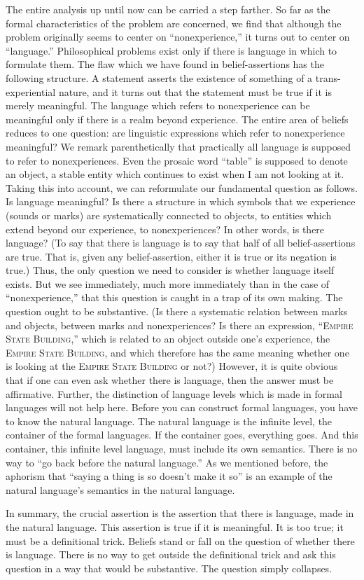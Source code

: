 The entire analysis up until now can be carried a step farther. So far as the formal characteristics of the problem are concerned, we find that although the problem originally seems to center on \enquote{nonexperience,} it turns out to center on \enquote{language.} Philosophical problems exist only if there is language in which to formulate them. The flaw which we have found in belief-assertions has the following structure. A statement asserts the existence of something of a trans-experiential nature, and it turns out that the statement must be true if it is merely meaningful. The language which refers to nonexperience can be meaningful only if there is a realm beyond experience. The entire area of beliefs reduces to one question: are linguistic expressions which refer to nonexperience meaningful? We remark parenthetically that practically all language is supposed to refer to nonexperiences. Even the prosaic word \enquote{table} is supposed to denote an object, a stable entity which continues to exist when I am not looking at it. Taking this into account, we can reformulate our fundamental question as follows. Is language meaningful? Is there a structure in which symbols that we experience (sounds or marks) are systematically connected to objects, to entities which extend beyond our experience, to nonexperiences? In other words, is there language? (To say that there is language is to say that half of all belief-assertions are true. That is, given any belief-assertion, either it is true or its negation is true.) Thus, the only question we need to consider is whether language itself exists. But we see immediately, much more immediately than in the case of \enquote{nonexperience,} that this question is caught in a trap of its own making. The question ought to be substantive. (Is there a systematic relation between marks and objects, between marks and nonexperiences? Is there an expression, \enquote{\textsc{Empire State Building,}} which is related to an object outside one's experience, the \textsc{Empire State Building}, and which therefore has the same meaning whether one is looking at the \textsc{Empire State Building} or not?) However, it is quite obvious that if one can even ask whether there is language, then the answer must be affirmative. Further, the distinction of language levels which is made in formal languages will not help here. Before you can construct formal languages, you have to know the natural language. The natural language is the infinite level, the container of the formal languages. If the container goes, everything goes. And this container, this infinite level language, must include its own semantics. There is no way to \enquote{go back before the natural language.} As we mentioned before, the aphorism that \enquote{saying a thing is so doesn't make it so} is an example of the natural language's semantics in the natural language. 

In summary, the crucial assertion is the assertion that there is language, made in the natural language. This assertion is true if it is meaningful. It is too true; it must be a definitional trick. Beliefs stand or fall on the question of whether there is language. There is no way to get outside the definitional trick and ask this question in a way that would be substantive. The question simply collapses. 


